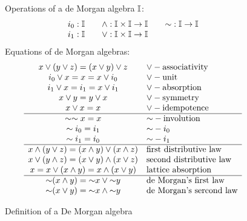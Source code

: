 \begin{figure}
\begin{small}
    Operations of a de Morgan algebra \( \mathbb{I} \):
    \[
    \begin{array}{lclcl}
    i_0 : \mathbb{I} & & \land : \mathbb{I} \times \mathbb{I} \to \mathbb{I} & & {\sim} : \mathbb{I} \to \mathbb{I} \\
    i_1 : \mathbb{I} & & \lor : \mathbb{I} \times \mathbb{I} \to \mathbb{I} & &
    \end{array}
    \]
    Equations of de Morgan algebras:
    \[
    \begin{array}{cl}
        x \lor (y \lor z) = (x \lor y) \lor z       & \lor-\text{associativity} \\
        i_0 \lor x = x = x \lor i_0           & \lor-\text{unit} \\
        i_1 \lor x = i_1 = x \lor i_1         & \lor-\text{absorption} \\
        x \lor y = y \lor x                         & \lor-\text{symmetry} \\
        x \lor x = x                                & \lor-\text{idempotence} \\
        \hline
        \sim \sim x = x                             & {\sim}-\text{involution} \\
        \sim i_0 = i_1                         & {\sim}-i_0 \\
        \sim i_1 = i_0                         & {\sim}-i_1 \\
        \hline
        x \land (y \lor z) = (x \land y) \lor (x \land z) & \text{first distributive law} \\
        x \lor (y \land z) = (x \lor y) \land (x \lor z) & \text{second distributive law} \\
        x = x \lor (x \land y) = x \land (x \lor y) & \text{lattice absorption} \\
        \hline
        {\sim} (x \land y) = {\sim} x \lor {\sim} y & \text{de Morgan's first law} \\
        {\sim} (x \lor y) = {\sim} x \land {\sim} y & \text{de Morgan's sercond law}
    \end{array}
    \]
\end{small}
    \caption{Definition of a De Morgan algebra}
    \label{fig:deMorgan}
\end{figure}

